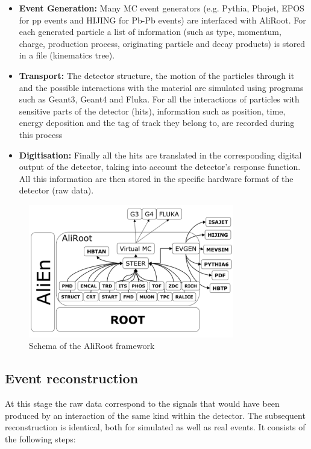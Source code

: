 \begin{itemize}
\item \textbf{Event Generation:} Many MC event generators (e.g. Pythia, Phojet, EPOS for pp events and HIJING for Pb-Pb events) are interfaced with AliRoot. For each generated particle a list of information (such as type, momentum, charge, production process, originating particle and decay products) is stored in a file (kinematics tree).

\item \textbf{Transport:} The detector structure, the motion of the particles through it and the possible interactions with the material are simulated using programs such as Geant3, Geant4 and Fluka. For all the interactions of particles with sensitive parts of the detector (hits), information such as position, time, energy deposition and the tag of track they belong to, are recorded during this process

\item \textbf{Digitisation:} Finally all the hits are translated in the corresponding digital output of the detector, taking into account the detector's response function. All this information are then stored in the specific hardware format of the detector (raw data).
\end{itemize}


\begin{figure}[t]
\centering
\includegraphics[width=0.8\textwidth]{Images/Chapter3/STEER}
\caption[AliRoot framework]{Schema of the AliRoot framework}
\label{Fig:cap3-1.12}
\end{figure}

\subsection{Event reconstruction }
\label{par:3.2e}
At this stage the raw data correspond to the signals that would have been produced by an interaction of the same kind within the detector. The subsequent reconstruction is identical, both for simulated as well as real events. It consists of the following steps:

